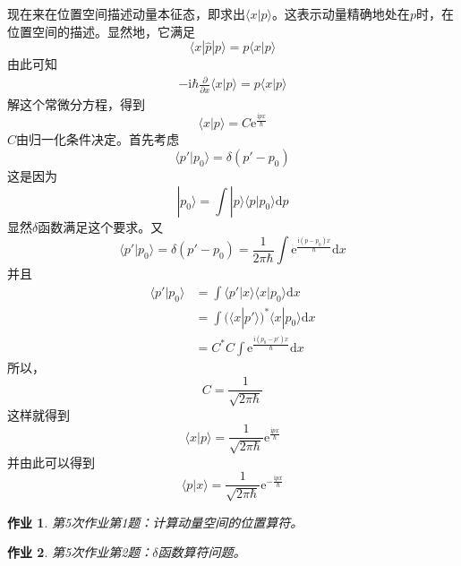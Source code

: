 \documentclass[12pt]{article}
\newtheorem{asg}{作业}
\begin{document}
    现在来在位置空间描述动量本征态，即求出$\langle x|p \rangle$。这表示动量精确地处在$p$时，在位置空间的描述。显然地，它满足
    \begin{equation*}
        \langle x|\hat{p}|p\rangle = p\langle x|p \rangle
    \end{equation*}
    由此可知 
    \begin{align*}
        -\mathrm{i}\hbar \frac {\partial}{\partial x} \langle x|p \rangle = p \langle x|p \rangle
    \end{align*}
    解这个常微分方程，得到
    \begin{equation*}
        \langle x|p \rangle = C \mathrm{e}^{\frac {\mathrm{i}px}\hbar}
    \end{equation*}
    $C$由归一化条件决定。首先考虑
    \begin{equation*}
        \langle p' | p_0 \rangle = \delta (p'-p_0)
    \end{equation*}
    这是因为
    \begin{equation*}
        |p_0 \rangle = \int |p\rangle \langle p|p_0\rangle \mathrm{d}p
    \end{equation*}
    显然$\delta$函数满足这个要求。又
    \begin{equation*}
        \langle p' | p_0 \rangle = \delta (p'-p_0) = \frac 1{2\pi\hbar} \int \mathrm{e}^{\frac {\mathrm{i}(p-p_0)x}{\hbar}} \mathrm{d}x
    \end{equation*}
    并且
    \begin{align*}
        \langle p'|p_0 \rangle &= \int \langle p'|x\rangle \langle x|p_0 \rangle \mathrm{d}x\\
        &= \int (\langle x|p' \rangle)^* \langle x|p_0 \rangle \mathrm{d}x\\
        &= C^*C\int \mathrm{e}^{\frac {\mathrm{i}(p_0-p')x}{\hbar}} \mathrm{d}x
    \end{align*}
    所以， 
    \begin{equation*}
        C = \frac 1{\sqrt{2\pi\hbar}}
    \end{equation*}
    这样就得到 
    \begin{equation*}
        \langle x|p \rangle = \frac 1{\sqrt{2\pi\hbar}} \mathrm{e}^{\frac {\mathrm{i}px}{\hbar}}
    \end{equation*}
    并由此可以得到
    \begin{equation*}
        \langle p|x \rangle = \frac 1{\sqrt{2\pi\hbar}} \mathrm{e}^{-\frac {\mathrm{i}px}{\hbar}}
    \end{equation*}
    \begin{asg}
        第5次作业第1题：计算动量空间的位置算符。
    \end{asg}
    \begin{asg}
        第5次作业第2题：$\delta$函数算符问题。
    \end{asg}
\end{document}
